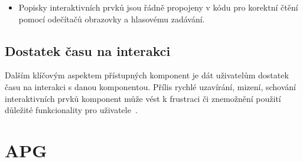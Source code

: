 \begin{itemize}
    \item Popisky interaktivních prvků jsou řádně propojeny v kódu pro korektní čtění pomocí odečítačů obrazovky a hlasovému zadávání.
\end{itemize}

\subsection{Dostatek času na interakci}

Dalším klíčovým aspektem přístupných komponent je dát uživatelům dostatek času na interakci s danou komponentou.
Přílis rychlé uzavírání, mizení, schování interaktivních prvků komponent může vést k frustraci či znemožnění použití důležité funkcionality pro uživatele~\cite{w3-accessibility-principles}.

\section{APG}

